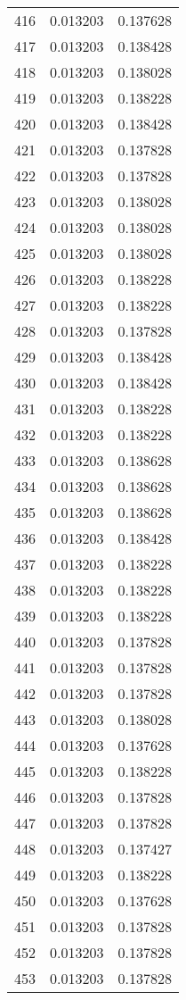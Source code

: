\begin{longtable}{rrr}
416 & 0.013203 & 0.137628 \\
417 & 0.013203 & 0.138428 \\
418 & 0.013203 & 0.138028 \\
419 & 0.013203 & 0.138228 \\
420 & 0.013203 & 0.138428 \\
421 & 0.013203 & 0.137828 \\
422 & 0.013203 & 0.137828 \\
423 & 0.013203 & 0.138028 \\
424 & 0.013203 & 0.138028 \\
425 & 0.013203 & 0.138028 \\
426 & 0.013203 & 0.138228 \\
427 & 0.013203 & 0.138228 \\
428 & 0.013203 & 0.137828 \\
429 & 0.013203 & 0.138428 \\
430 & 0.013203 & 0.138428 \\
431 & 0.013203 & 0.138228 \\
432 & 0.013203 & 0.138228 \\
433 & 0.013203 & 0.138628 \\
434 & 0.013203 & 0.138628 \\
435 & 0.013203 & 0.138628 \\
436 & 0.013203 & 0.138428 \\
437 & 0.013203 & 0.138228 \\
438 & 0.013203 & 0.138228 \\
439 & 0.013203 & 0.138228 \\
440 & 0.013203 & 0.137828 \\
441 & 0.013203 & 0.137828 \\
442 & 0.013203 & 0.137828 \\
443 & 0.013203 & 0.138028 \\
444 & 0.013203 & 0.137628 \\
445 & 0.013203 & 0.138228 \\
446 & 0.013203 & 0.137828 \\
447 & 0.013203 & 0.137828 \\
448 & 0.013203 & 0.137427 \\
449 & 0.013203 & 0.138228 \\
450 & 0.013203 & 0.137628 \\
451 & 0.013203 & 0.137828 \\
452 & 0.013203 & 0.137828 \\
453 & 0.013203 & 0.137828 \\

\end{longtable}

